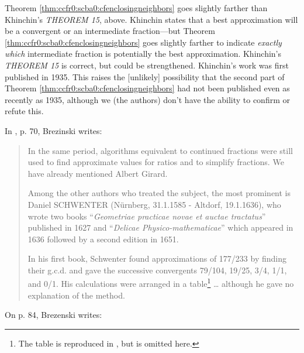 \noindent{}Theorem \ref{thm:ccfr0:scba0:cfenclosingneighbors} goes 
slightly farther than Khinchin's \emph{THEOREM 15}, above.  
Khinchin  states
that a best approximation will be a convergent or an intermediate 
fraction---but Theorem \ref{thm:ccfr0:scba0:cfenclosingneighbors}
goes slightly farther to indicate \emph{exactly which} intermediate fraction
is potentially the best approximation.  Khinchin's \emph{THEOREM 15}
is correct, but could be strengthened.  Khinchin's work 
was first published in 1935.  This raises the [unlikely] possibility
that the second part of Theorem \ref{thm:ccfr0:scba0:cfenclosingneighbors}
had not been published even as recently as 1935, although
we (the authors) don't have the ability to confirm or
refute this.

In \cite{bibref:b:HistoryCfPadeApproxBrezinski}, p. 70, Brezinski
writes:

\begin{quote}
In the same period, algorithms equivalent to continued fractions were
still used to find approximate values for ratios and to simplify
fractions.  We have already mentioned Albert Girard.

Among the other authors who treated the subject, the most prominent
is Daniel SCHWENTER 
(N\"urnberg, 31.1.1585 - Altdorf, 19.1.1636),
who wrote two books ``\emph{Geometriae practicae novae et auctae
tractatus}'' published in 1627 and ``\emph{Delicae
Physico-mathematicae}'' which appeared in 1636 followed by a
second edition in 1651.

In his first book, Schwenter found approximations of 177/233 by
finding their g.c.d. and gave the successive convergents
79/104, 19/25, 3/4, 1/1, and 0/1.  His calculations were arranged
in a table\footnote{The table is reproduced in 
\cite{bibref:b:HistoryCfPadeApproxBrezinski}, 
but is omitted here.} \ldots{} although he gave no explanation of the method.
\end{quote}

On p. 84, Brezenski  writes:


